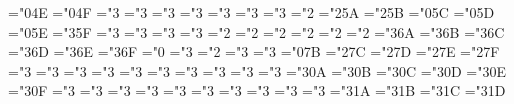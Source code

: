 \mathchardef\blacktriangle="0\@xm4E
\mathchardef\triangledown="0\@xm4F
\mathchardef\eqcirc="3
\mathchardef\lesseqgtr="3
\mathchardef\gtreqless="3
\mathchardef\lesseqqgtr="3
\mathchardef\gtreqqless="3
\mathchardef\Rrightarrow="3
\mathchardef\Lleftarrow="3
\mathchardef\veebar="2
\mathchardef\barwedge="2\@xm5A
\mathchardef\doublebarwedge="2\@xm5B
\mathchardef\angle="0\@xm5C
\mathchardef\measuredangle="0\@xm5D
\mathchardef\sphericalangle="0\@xm5E
\mathchardef\varpropto="3\@xm5F
\mathchardef\smallsmile="3
\mathchardef\smallfrown="3
\mathchardef\Subset="3
\mathchardef\Supset="3
\mathchardef\Cup="2
\let\doublecup=\Cup
\mathchardef\Cap="2
\let\doublecap=\Cap
\mathchardef\curlywedge="2
\mathchardef\curlyvee="2
\mathchardef\leftthreetimes="2
\mathchardef\rightthreetimes="2
\mathchardef\subseteqq="3\@xm6A
\mathchardef\supseteqq="3\@xm6B
\mathchardef\bumpeq="3\@xm6C
\mathchardef\Bumpeq="3\@xm6D
\mathchardef\lll="3\@xm6E
\let\llless=\lll
\mathchardef\ggg="3\@xm6F
\let\gggtr=\ggg
\mathchardef\circledS="0
\mathchardef\pitchfork="3
\mathchardef\dotplus="2
\mathchardef\backsim="3
\mathchardef\backsimeq="3
\mathchardef\complement="0\@xm7B
\mathchardef\intercal="2\@xm7C
\mathchardef\circledcirc="2\@xm7D
\mathchardef\circledast="2\@xm7E
\mathchardef\circleddash="2\@xm7F
\def\ulcorner{\delimiter"4\@xm70\@xm70 }
\def\urcorner{\delimiter"5\@xm71\@xm71 }
\def\llcorner{\delimiter"4\@xm78\@xm78 }
\def\lrcorner{\delimiter"5\@xm79\@xm79 }
\def\yen{\mathhexbox\@xm55 }
\def\checkmark{\mathhexbox\@xm58 }
\def\circledR{\mathhexbox\@xm72 }
\def\maltese{\mathhexbox\@xm7A }
\mathchardef\lvertneqq="3
\mathchardef\gvertneqq="3
\mathchardef\nleq="3
\mathchardef\ngeq="3
\mathchardef\nless="3
\mathchardef\ngtr="3
\mathchardef\nprec="3
\mathchardef\nsucc="3
\mathchardef\lneqq="3
\mathchardef\gneqq="3
\mathchardef\nleqslant="3\@ym0A
\mathchardef\ngeqslant="3\@ym0B
\mathchardef\lneq="3\@ym0C
\mathchardef\gneq="3\@ym0D
\mathchardef\npreceq="3\@ym0E
\mathchardef\nsucceq="3\@ym0F
\mathchardef\precnsim="3
\mathchardef\succnsim="3
\mathchardef\lnsim="3
\mathchardef\gnsim="3
\mathchardef\nleqq="3
\mathchardef\ngeqq="3
\mathchardef\precneqq="3
\mathchardef\succneqq="3
\mathchardef\precnapprox="3
\mathchardef\succnapprox="3
\mathchardef\lnapprox="3\@ym1A
\mathchardef\gnapprox="3\@ym1B
\mathchardef\nsim="3\@ym1C
\mathchardef\ncong="3\@ym1D
\def\napprox{\not\approx}
